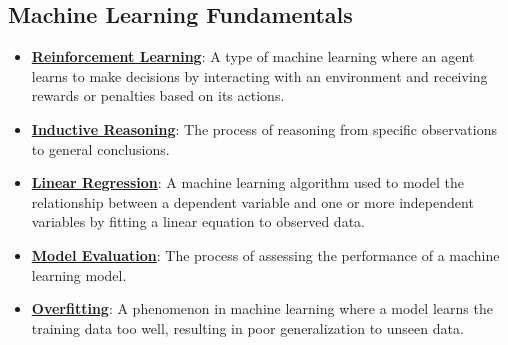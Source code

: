 \documentclass{article}%
\begin{document}
%
\subsection{Machine Learning Fundamentals}%
\label{subsec:MachineLearningFundamentals}%
\begin{itemize}[leftmargin=*]%
\item \href{\url{https://purdue.brightspace.com/d2l/common/assets/pdfjs-d2l-dist/1.0.14-legacy/web/viewer.html?file=\%252Fcontent\%252Fenforced\%252F1095467-wl.202510.CS.24300.001\%252F02L2-Intro.pdf\%253Fou\%253D1095467\&lang=en-us\&container=d2l-fileviewer-rendered-pdf\&fullscreen=d2l-fileviewer-rendered-pdf-dialog\&height=667}#page=46}{\textbf{Reinforcement Learning}}: A type of machine learning where an agent learns to make decisions by interacting with an environment and receiving rewards or penalties based on its actions.%
\item \href{\url{https://purdue.brightspace.com/d2l/common/assets/pdfjs-d2l-dist/1.0.14-legacy/web/viewer.html?file=\%252Fcontent\%252Fenforced\%252F1095467-wl.202510.CS.24300.001\%252F05L2-ML\%20Basics.pdf\%253Fou\%253D1095467\&lang=en-us\&container=d2l-fileviewer-rendered-pdf\&fullscreen=d2l-fileviewer-rendered-pdf-dialog\&height=667}#page=3}{\textbf{Inductive Reasoning}}: The process of reasoning from specific observations to general conclusions.%
\item \href{\url{https://purdue.brightspace.com/d2l/common/assets/pdfjs-d2l-dist/1.0.14-legacy/web/viewer.html?file=\%252Fcontent\%252Fenforced\%252F1095467-wl.202510.CS.24300.001\%252F05L2-ML\%20Basics.pdf\%253Fou\%253D1095467\&lang=en-us\&container=d2l-fileviewer-rendered-pdf\&fullscreen=d2l-fileviewer-rendered-pdf-dialog\&height=667}#page=6}{\textbf{Linear Regression}}: A machine learning algorithm used to model the relationship between a dependent variable and one or more independent variables by fitting a linear equation to observed data.%
\item \href{\url{https://purdue.brightspace.com/d2l/common/assets/pdfjs-d2l-dist/1.0.14-legacy/web/viewer.html?file=\%252Fcontent\%252Fenforced\%252F1095467-wl.202510.CS.24300.001\%252F05L2-ML\%20Basics.pdf\%253Fou\%253D1095467\&lang=en-us\&container=d2l-fileviewer-rendered-pdf\&fullscreen=d2l-fileviewer-rendered-pdf-dialog\&height=667}#page=8}{\textbf{Model Evaluation}}: The process of assessing the performance of a machine learning model.%
\item \href{\url{https://purdue.brightspace.com/d2l/common/assets/pdfjs-d2l-dist/1.0.14-legacy/web/viewer.html?file=\%252Fcontent\%252Fenforced\%252F1095467-wl.202510.CS.24300.001\%252F05L2-ML\%20Basics.pdf\%253Fou\%253D1095467\&lang=en-us\&container=d2l-fileviewer-rendered-pdf\&fullscreen=d2l-fileviewer-rendered-pdf-dialog\&height=667}#page=14}{\textbf{Overfitting}}: A phenomenon in machine learning where a model learns the training data too well, resulting in poor generalization to unseen data.%

\end{itemize}
\end{document}
